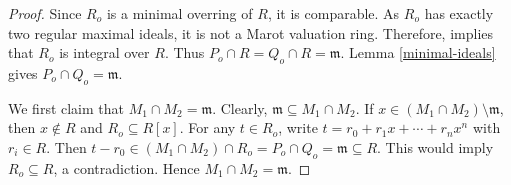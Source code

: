 \documentclass[12pt]{article}
\begin{document}
	\begin{proof}
		
		Since $R_o$ is a minimal overring of $R$, it is comparable.	As $R_o$ has exactly two regular maximal ideals, it is not a Marot valuation ring. Therefore, \cite[Proposition 3.2]{marot} implies that $R_o$ is integral over $R$. Thus $P_o\cap R=Q_o\cap R=\mathfrak{m}$. Lemma \ref{minimal-ideals} gives $P_o\cap Q_o=\mathfrak{m}$. 
		
		\smallskip We first claim that $M_1\cap M_2=\mathfrak{m}$. Clearly, $\mathfrak{m}\subseteq M_1\cap M_2$. If $x\in(M_1\cap M_2)\setminus \mathfrak{m}$, then $x\notin R$ and $R_o\subseteq R[x]$. For any $t\in R_o$, write $t=r_0+r_1x+\cdots+r_nx^n$ with $r_i\in R$. Then $t-r_0\in(M_1\cap M_2)\cap R_o=P_o\cap Q_o=\mathfrak{m}\subseteq R$. This would imply $R_o\subseteq R$, a contradiction. Hence $M_1\cap M_2=\mathfrak{m}$.
		

\end{proof}
\end{document}
